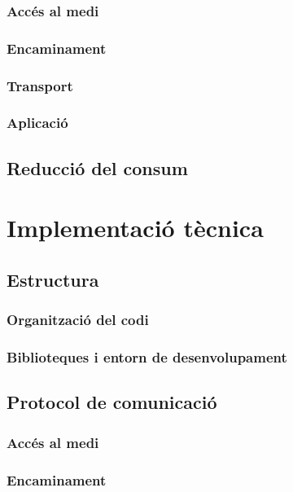 \documentclass{tfgitic}[2024/07/01]
\begin{document}
\subsection{Accés al medi}
\subsection{Encaminament}
\subsection{Transport}
\subsection{Aplicació}
\section{Reducció del consum}

\chapter{Implementació tècnica}
\section{Estructura}
\subsection{Organització del codi}
\subsection{Biblioteques i entorn de desenvolupament}
\section{Protocol de comunicació}
\subsection{Accés al medi}
\subsection{Encaminament}
\end{document}
